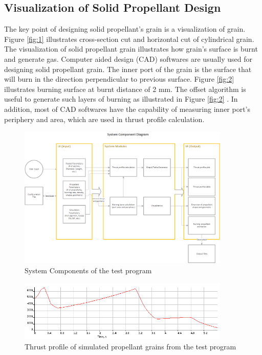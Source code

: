 \documentclass[conference]{IEEEtran}
\begin{document}
\subsection{Visualization of Solid Propellant Design}
The key point of designing solid propellant’s grain is a visualization of grain. Figure {\ref{fig:1}} illustrates cross-section cut and horizontal cut of cylindrical grain. The visualization of solid propellant grain illustrates how grain's surface is burnt and generate gas. Computer aided design (CAD) softwares are usually used for designing solid propellant grain. The inner port of the grain is the surface that will burn in the direction perpendicular to previous surface. Figure {\ref{fig:2}} illustrates burning surface at burnt distance of 2 mm. The offset algorithm is useful to generate such layers of burning as illustrated in Figure {\ref{fig:2}} {\cite{offset}}. In addition, most of CAD softwares have the capability of measuring inner port's periphery and area, which are used in thrust profile calculation.   




\begin{figure}[t]
\centering
\includegraphics[width=0.9\textwidth]{SystemComponents}
\caption{System Components of the test program}
\label{fig:3}
\end{figure}
\begin{figure}[t]
\centering
\includegraphics[width=0.9\textwidth]{thrust}
\caption{Thrust profile of simulated propellant grains from the test program}
\label{fig:5}
\end{figure}
\end{document}
